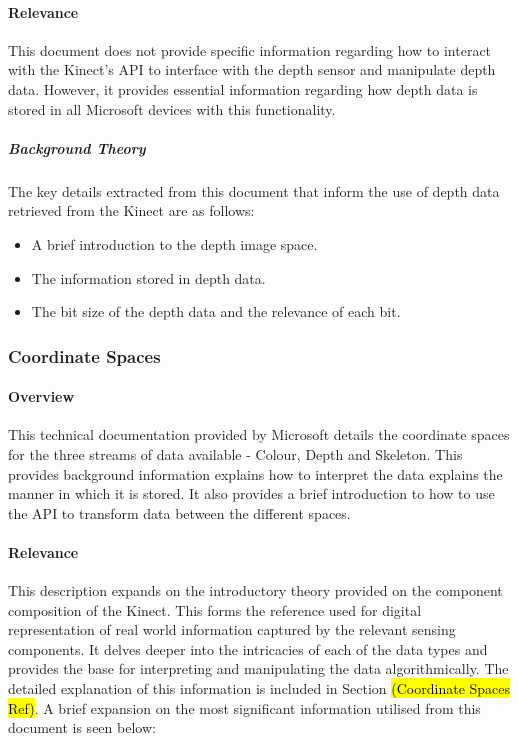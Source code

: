 \paragraph{Relevance}
This document does not provide specific information regarding how to interact with the Kinect's API to interface with the depth sensor and manipulate depth data. However, it provides essential information regarding how depth data is stored in all Microsoft devices with this functionality. 

\subparagraph{Background Theory}
The key details extracted from this document that inform the use of depth data retrieved from the Kinect are as follows: 
\begin{itemize}
	\item A brief introduction to the depth image space.
	\item The information stored in depth data.
	\item The bit size of the depth data and the relevance of each bit.
\end{itemize}

\subsubsection{Coordinate Spaces \cite{msdnCoSpaces2017}}

\paragraph{Overview}
This technical documentation provided by Microsoft details the coordinate spaces for the three streams of data available - Colour, Depth and Skeleton. This provides background information explains how to interpret the data explains the manner in which it is stored. It also provides a brief introduction to how to use the API to transform data between the different spaces.

\paragraph{Relevance}
This description expands on the introductory theory provided on the component composition of the Kinect. This forms the reference used for digital representation of real world information captured by the relevant sensing components. It delves deeper into the intricacies of each of the data types and provides the base for interpreting and manipulating the data algorithmically. The detailed explanation of this information is included in Section \hl{(Coordinate Spaces Ref)}. A brief expansion on the most significant information utilised from this document is seen below: 


